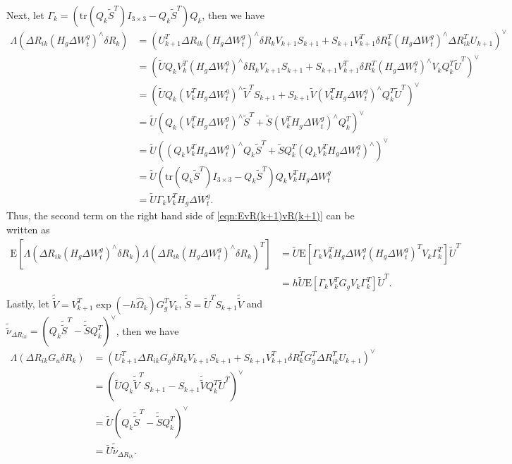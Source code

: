 \documentclass[10pt]{article}
\newcommand{\tr}[1]{\ensuremath{\mathrm{tr}\left( #1 \right)}}
\newcommand{\expect}[1]{\ensuremath{\mathrm{E}\left[ #1 \right]}}
\begin{document}
Next, let $\Gamma_k = \left( \tr{Q_k\tilde{S}^T}I_{3\times 3} - Q_k\tilde{S}^T \right) Q_k$, then we have
\begin{align*}
	\Lambda\left( \Delta R_{ik} (H_g\Delta W_t^g)^\wedge \delta R_k \right) &= (U_{k+1}^T \Delta R_{ik} (H_g\Delta W_t^g)^\wedge \delta R_kV_{k+1}S_{k+1} + S_{k+1}V_{k+1}^T\delta R_k^T (H_g\Delta W_t^g)^\wedge \Delta R_{ik}^TU_{k+1})^\vee \\
	&= (\tilde{U}Q_kV_k^T(H_g\Delta W_t^g)^\wedge \delta R_kV_{k+1}S_{k+1} + S_{k+1}V_{k+1}^T\delta R_k^T (H_g\Delta W_t^g)^\wedge V_kQ_k^T\tilde{U}^T)^\vee \\
	&= (\tilde{U}Q_k(V_k^TH_g\Delta W_t^g)^\wedge \tilde{V}^TS_{k+1} + S_{k+1}\tilde{V}(V_k^TH_g\Delta W_t^g)^\wedge Q_k^T\tilde{U}^T)^\vee \\
	&= \tilde{U}(Q_k(V_k^TH_g\Delta W_t^g)^\wedge \tilde{S}^T + \tilde{S}(V_k^TH_g\Delta W_t^g)^\wedge Q_k^T)^\vee \\
	&= \tilde{U}((Q_kV_k^TH_g\Delta W_t^g)^\wedge Q_k\tilde{S}^T + \tilde{S}Q_k^T(Q_kV_k^TH_g\Delta W_t^g)^\wedge)^\vee \\
	&= \tilde{U}\left( \tr{Q_k\tilde{S}^T}I_{3\times 3} - Q_k\tilde{S}^T \right) Q_kV_k^TH_g\Delta W_t^g \\
	&= \tilde{U}\Gamma_kV_k^TH_g\Delta W_t^g.
\end{align*}
Thus, the second term on the right hand side of \eqref{eqn:EvR(k+1)vR(k+1)} can be written as
\begin{align}
	\expect{\Lambda\left( \Delta R_{ik} (H_g\Delta W_t^g)^\wedge \delta R_k \right) \Lambda\left( \Delta R_{ik} (H_g\Delta W_t^g)^\wedge \delta R_k \right)^T} &= \tilde{U} \expect{\Gamma_kV_k^TH_g\Delta W_t^g (H_g\Delta W_t^g)^TV_k\Gamma_k^T} \tilde{U}^T \nonumber \\
	&= h\tilde{U} \expect{\Gamma_kV_k^TG_gV_k\Gamma_k^T} \tilde{U}^T.
\end{align}
Lastly, let $\tilde{\tilde{V}} = V_{k+1}^T\exp(-h\hat{\Omega}_k)G_g^TV_k$, $\tilde{\tilde{S}} = \tilde{U}^TS_{k+1}\tilde{\tilde{V}}$ and $\tilde{\tilde{\nu}}_{\Delta R_{ik}} = (Q_k\tilde{\tilde{S}}^T - \tilde{\tilde{S}}Q_k^T)^\vee$, then we have
\begin{align*}
	\Lambda\left( \Delta R_{ik}G_u\delta R_k \right) &= (U_{k+1}^T \Delta R_{ik} G_g \delta R_kV_{k+1}S_{k+1} + S_{k+1}V_{k+1}^T\delta R_k^T G_g^T \Delta R_{ik}^TU_{k+1})^\vee \\
	&= (\tilde{U}Q_k\tilde{\tilde{V}}^TS_{k+1} - S_{k+1}\tilde{\tilde{V}}Q_k^T\tilde{U}^T)^\vee \\
	&= \tilde{U}(Q_k\tilde{\tilde{S}}^T - \tilde{\tilde{S}}Q_k^T)^\vee \\
	&= \tilde{U}\tilde{\tilde{\nu}}_{\Delta R_{ik}}.
\end{align*}
\end{document}
